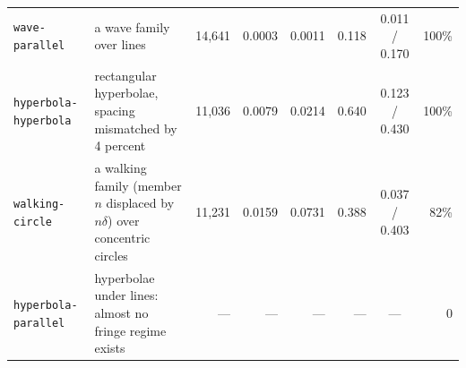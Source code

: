 \begin{table}[t]
\begin{tabular}{@{}llrrrrcr@{}}
\texttt{wave-parallel} & a wave family over lines & 14,641 & 0.0003 & 0.0011 & 0.118 & 0.011 / 0.170 & 100\% \\
\texttt{hyperbola-hyperbola} & rectangular hyperbolae, spacing mismatched by 4 percent & 11,036 & 0.0079 & 0.0214 & 0.640 & 0.123 / 0.430 & 100\% \\
\texttt{walking-circle} & a walking family (member $n$ displaced by $n\delta$) over concentric circles & 11,231 & 0.0159 & 0.0731 & 0.388 & 0.037 / 0.403 & 82\% \\
\texttt{hyperbola-parallel} & hyperbolae under lines: almost no fringe regime exists & --- & --- & --- & --- & --- & $0$ \\
\bottomrule
\end{tabular}
\end{table}
